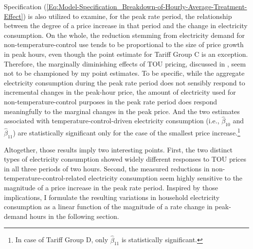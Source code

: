 Specification (\ref{Eq:Model-Specification_Breakdown-of-Hourly-Average-Treatment-Effect}) is also utilized to examine, for the peak rate period, the relationship between the degree of a price increase in that period and the change in electricity consumption. On the whole, the reduction stemming from electricity demand for non-temperature-control use tends to be proportional to the size of price growth in peak hours, even though the point estimate for Tariff Group C is an exception. Therefore, the marginally diminishing effects of TOU pricing, discussed in \cite{Peaking-Interest:How-Awareness-Drives-the-Effectiveness-of-Time-of-Use-Electricity-Pricing_Prest_2020}, seem not to be championed by my point estimates. To be specific, while the aggregate electricity consumption during the peak rate period does not sensibly respond to incremental changes in the peak-hour price, the amount of electricity used for non-temperature-control purposes in the peak rate period does respond meaningfully to the marginal changes in the peak price. And the two estimates associated with temperature-control-driven electricity consumption (i.e., $\hat{\beta}_{10}$ and $\hat{\beta}_{11}$) are statistically significant only for the case of the smallest price increase.\footnote{In case of Tariff Group D, only $\hat{\beta}_{11}$ is statistically significant.} 

Altogether, those results imply two interesting points. First, the two distinct types of electricity consumption showed widely different responses to TOU prices in all three periods of two hours. Second, the measured reductions in non-temperature-control-related electricity consumption seem highly sensitive to the magnitude of a price increase in the peak rate period. Inspired by those implications, I formulate the resulting variations in household electricity consumption as a linear function of the magnitude of a rate change in peak-demand hours in the following section.
